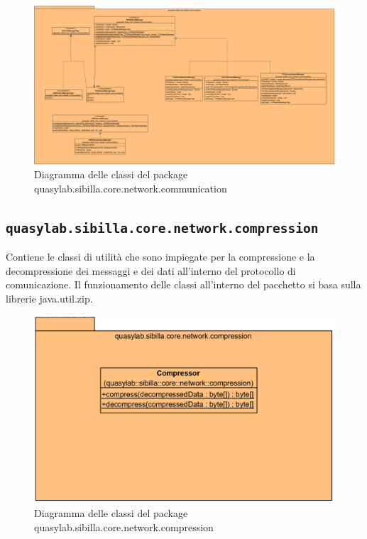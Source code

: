 \begin{figure}[H]
    \includegraphics[width=\linewidth]{images/quasylab.sibilla.core.network.communication.png}
    \captionsetup{justification=centering}
    \caption{Diagramma delle classi del package quasylab.sibilla.core.network.communication}
  \end{figure}

\subsection{\texttt{quasylab.sibilla.core.network.compression}} Contiene le classi di utilità che sono impiegate per la compressione e la decompressione dei messaggi e dei dati all’interno del protocollo di comunicazione. Il funzionamento delle classi all’interno del pacchetto si basa sulla librerie java.util.zip.

\begin{figure}[H]
    \includegraphics[width=\linewidth]{images/quasylab.sibilla.core.network.compression.png}
    \captionsetup{justification=centering}
    \caption{Diagramma delle classi del package quasylab.sibilla.core.network.compression}
  \end{figure}

